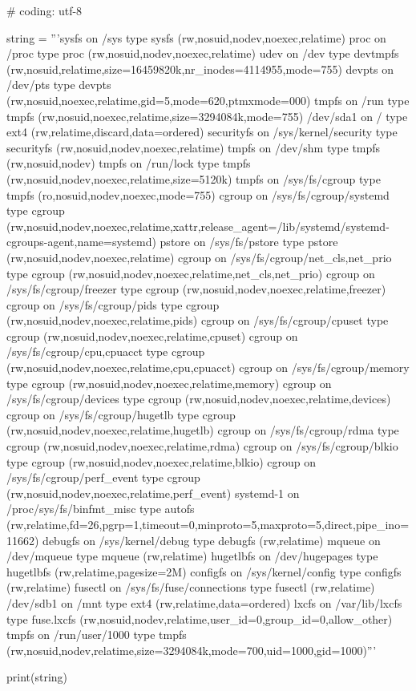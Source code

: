 \begin{mylisting}[label={lst:mount},language=sh,caption=mountコマンド]
# coding: utf-8

string = '''sysfs on /sys type sysfs (rw,nosuid,nodev,noexec,relatime)
proc on /proc type proc (rw,nosuid,nodev,noexec,relatime)
udev on /dev type devtmpfs (rw,nosuid,relatime,size=16459820k,nr_inodes=4114955,mode=755)
devpts on /dev/pts type devpts (rw,nosuid,noexec,relatime,gid=5,mode=620,ptmxmode=000)
tmpfs on /run type tmpfs (rw,nosuid,noexec,relatime,size=3294084k,mode=755)
/dev/sda1 on / type ext4 (rw,relatime,discard,data=ordered)
securityfs on /sys/kernel/security type securityfs (rw,nosuid,nodev,noexec,relatime)
tmpfs on /dev/shm type tmpfs (rw,nosuid,nodev)
tmpfs on /run/lock type tmpfs (rw,nosuid,nodev,noexec,relatime,size=5120k)
tmpfs on /sys/fs/cgroup type tmpfs (ro,nosuid,nodev,noexec,mode=755)
cgroup on /sys/fs/cgroup/systemd type cgroup (rw,nosuid,nodev,noexec,relatime,xattr,release_agent=/lib/systemd/systemd-cgroups-agent,name=systemd)
pstore on /sys/fs/pstore type pstore (rw,nosuid,nodev,noexec,relatime)
cgroup on /sys/fs/cgroup/net_cls,net_prio type cgroup (rw,nosuid,nodev,noexec,relatime,net_cls,net_prio)
cgroup on /sys/fs/cgroup/freezer type cgroup (rw,nosuid,nodev,noexec,relatime,freezer)
cgroup on /sys/fs/cgroup/pids type cgroup (rw,nosuid,nodev,noexec,relatime,pids)
cgroup on /sys/fs/cgroup/cpuset type cgroup (rw,nosuid,nodev,noexec,relatime,cpuset)
cgroup on /sys/fs/cgroup/cpu,cpuacct type cgroup (rw,nosuid,nodev,noexec,relatime,cpu,cpuacct)
cgroup on /sys/fs/cgroup/memory type cgroup (rw,nosuid,nodev,noexec,relatime,memory)
cgroup on /sys/fs/cgroup/devices type cgroup (rw,nosuid,nodev,noexec,relatime,devices)
cgroup on /sys/fs/cgroup/hugetlb type cgroup (rw,nosuid,nodev,noexec,relatime,hugetlb)
cgroup on /sys/fs/cgroup/rdma type cgroup (rw,nosuid,nodev,noexec,relatime,rdma)
cgroup on /sys/fs/cgroup/blkio type cgroup (rw,nosuid,nodev,noexec,relatime,blkio)
cgroup on /sys/fs/cgroup/perf_event type cgroup (rw,nosuid,nodev,noexec,relatime,perf_event)
systemd-1 on /proc/sys/fs/binfmt_misc type autofs (rw,relatime,fd=26,pgrp=1,timeout=0,minproto=5,maxproto=5,direct,pipe_ino=11662)
debugfs on /sys/kernel/debug type debugfs (rw,relatime)
mqueue on /dev/mqueue type mqueue (rw,relatime)
hugetlbfs on /dev/hugepages type hugetlbfs (rw,relatime,pagesize=2M)
configfs on /sys/kernel/config type configfs (rw,relatime)
fusectl on /sys/fs/fuse/connections type fusectl (rw,relatime)
/dev/sdb1 on /mnt type ext4 (rw,relatime,data=ordered)
lxcfs on /var/lib/lxcfs type fuse.lxcfs (rw,nosuid,nodev,relatime,user_id=0,group_id=0,allow_other)
tmpfs on /run/user/1000 type tmpfs (rw,nosuid,nodev,relatime,size=3294084k,mode=700,uid=1000,gid=1000)'''

print(string)
\end{mylisting}
